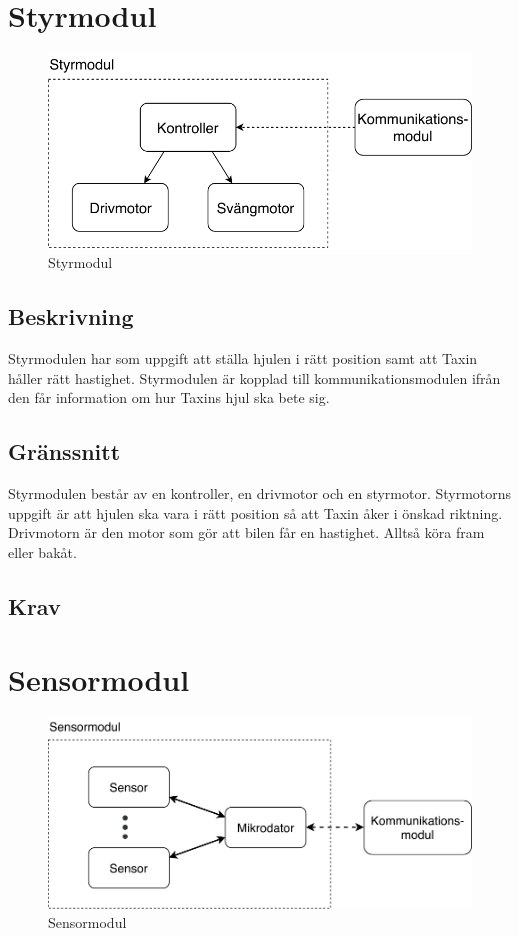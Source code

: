 \documentclass[kravspec/krav.tex]{subfiles}
\begin{document}
\section{Styrmodul}
\begin{figure}[h]
    \centering
    \includegraphics[width=0.6\linewidth]{kravspec/figures/styrmodul.pdf}
    \caption{Styrmodul}
    \label{fig:styrmodul}
\end{figure}

\subsection{Beskrivning}
Styrmodulen har som uppgift att ställa hjulen i rätt position samt att Taxin
håller rätt hastighet. Styrmodulen är kopplad till kommunikationsmodulen ifrån
den får information om hur Taxins hjul ska bete sig.

\subsection{Gränssnitt}
Styrmodulen består av en kontroller, en drivmotor och en styrmotor. Styrmotorns
uppgift är att hjulen ska vara i rätt position så att Taxin åker i önskad
riktning. Drivmotorn är den motor som gör att bilen får en hastighet. Alltså
köra fram eller bakåt.

\subsection{Krav}
\begin{reqlist}
    \req{}
\end{reqlist}

\clearpage
\section{Sensormodul}
\begin{figure}[h]
    \centering
    \includegraphics[width=0.6\linewidth]{kravspec/figures/sensormodul.pdf}
    \caption{Sensormodul}
    \label{fig:sensormodul}
\end{figure}
\end{document}
